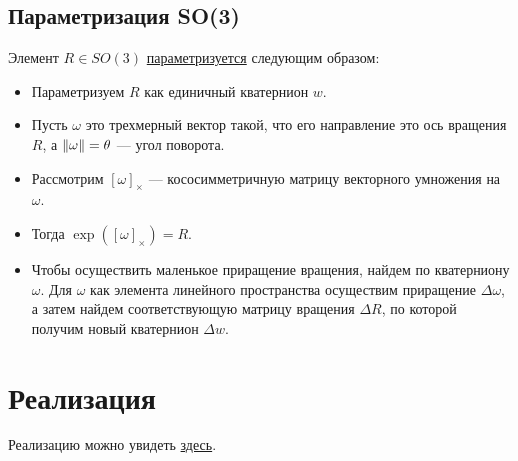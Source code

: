 \subsection{Параметризация SO(3)}
Элемент $R \in SO(3)$ \href{https://github.com/QuantumMechanicus/camera_calibration_test/blob/dev/core/utils/Local_Parametrization_SO3.h}{параметризуется}  следующим образом:
\begin{itemize}
	\item Параметризуем $R$ как единичный кватернион $w$.
	\item Пусть $\omega$ это трехмерный вектор такой, что его направление это ось вращения $R$, а $\left\lVert\omega\right\rVert = \theta$ --- угол поворота.
	\item Рассмотрим $[\omega]_{\times}$ --- кососимметричную матрицу векторного умножения на $\omega$.
	\item Тогда $\exp{([\omega]_{\times})} = R$.
	\item Чтобы осуществить маленькое приращение вращения, найдем по кватерниону $\omega$. Для $\omega$ как элемента линейного пространства осуществим приращение $\Delta\omega$, а затем найдем соответствующую матрицу вращения $\Delta R$, по которой получим новый кватернион $\Delta w$.    
\end{itemize}

\section{Реализация}
Реализацию можно увидеть \href{https://github.com/QuantumMechanicus/camera_calibration_test/tree/dev/subroutines/global_non_linear_optimizer}{здесь}.